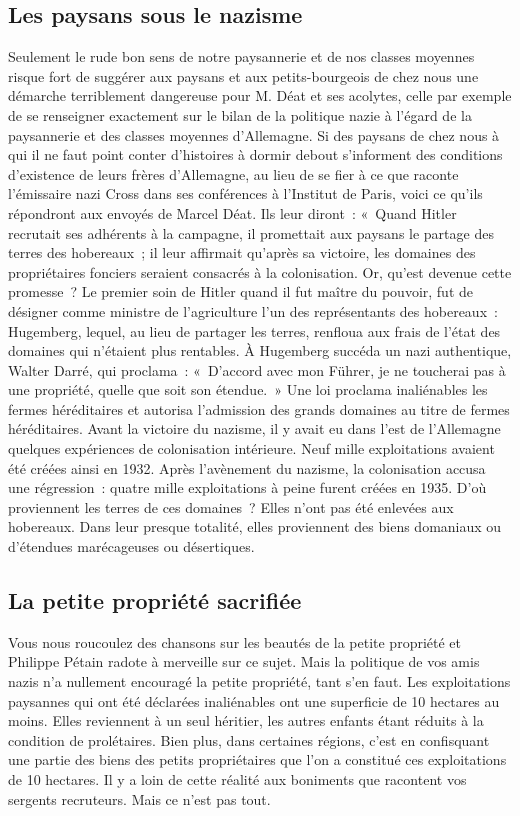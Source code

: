 \documentclass[french,twoside]{book} %
\begin{document}
\subsection[Les paysans sous le nazisme]{Les paysans sous le nazisme}
\noindent Seulement le rude bon sens de notre paysannerie et de nos classes moyennes risque fort de suggérer aux paysans et aux petits-bourgeois de chez nous une démarche terriblement dangereuse pour M. Déat et ses acolytes, celle par exemple de se renseigner exactement sur le bilan de la politique nazie à l’égard de la paysannerie et des classes moyennes d’Allemagne. Si des paysans de chez nous à qui il ne faut point conter d’histoires à dormir debout s’informent des conditions d’existence de leurs frères d’Allemagne, au lieu de se fier à ce que raconte l’émissaire nazi Cross dans ses conférences à l’Institut de Paris, voici ce qu’ils répondront aux envoyés de Marcel Déat. Ils leur diront : « Quand Hitler recrutait ses adhérents à la campagne, il promettait aux paysans le partage des terres des hobereaux ; il leur affirmait qu’après sa victoire, les domaines des propriétaires fonciers seraient consacrés à la colonisation. Or, qu’est devenue cette promesse ? Le premier soin de Hitler quand il fut maître du pouvoir, fut de désigner comme ministre de l’agriculture l’un des représentants des hobereaux : Hugemberg, lequel, au lieu de partager les terres, renfloua aux frais de l’état des domaines qui n’étaient plus rentables. À Hugemberg succéda un nazi authentique, Walter Darré, qui proclama : « D’accord avec mon Führer, je ne toucherai pas à une propriété, quelle que soit son étendue. » Une loi proclama inaliénables les fermes héréditaires et autorisa l’admission des grands domaines au titre de fermes héréditaires. Avant la victoire du nazisme, il y avait eu dans l’est de l’Allemagne quelques expériences de colonisation intérieure. Neuf mille exploitations avaient été créées ainsi en 1932. Après l’avènement du nazisme, la colonisation accusa une régression : quatre mille exploitations à peine furent créées en 1935. D’où proviennent les terres de ces domaines ? Elles n’ont pas été enlevées aux hobereaux. Dans leur presque totalité, elles proviennent des biens domaniaux ou d’étendues marécageuses ou désertiques.
\subsection[La petite propriété sacrifiée]{La petite propriété sacrifiée}
\noindent Vous nous roucoulez des chansons sur les beautés de la petite propriété et Philippe Pétain radote à merveille sur ce sujet. Mais la politique de vos amis nazis n’a nullement encouragé la petite propriété, tant s’en faut. Les exploitations paysannes qui ont été déclarées inaliénables ont une superficie de 10 hectares au moins. Elles reviennent à un seul héritier, les autres enfants étant réduits à la condition de prolétaires. Bien plus, dans certaines régions, c’est en confisquant une partie des biens des petits propriétaires que l’on a constitué ces exploitations de 10 hectares. Il y a loin de cette réalité aux boniments que racontent vos sergents recruteurs. Mais ce n’est pas tout.
\end{document}
